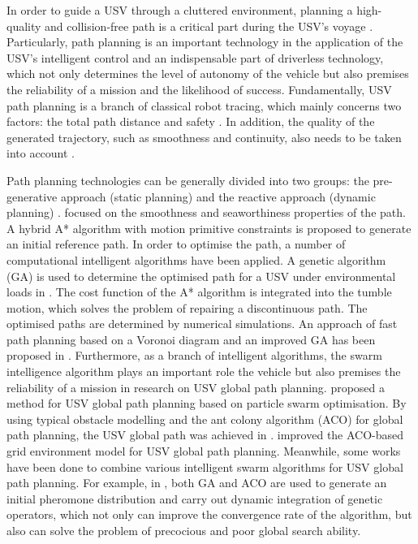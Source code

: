 \documentclass{PDS}%
\theoremstyle{definition}
\begin{document}
In order to guide a USV through a cluttered environment, planning a high-quality and
collision-free path is a critical part during the USV's voyage \citep{r7}. Particularly,
path planning is an important technology in the application of the USV's intelligent
control and an indispensable part of driverless technology, which not only determines the
level of autonomy of the vehicle but also premises the reliability of a mission and the
likelihood of success. Fundamentally, USV path planning is a branch of classical robot
tracing, which mainly concerns two factors: the total path distance and safety
\citep{r8}. In addition, the quality of the generated trajectory, such as smoothness and
continuity, also needs to be taken into account \citep{Smierzchalski1999}.


Path planning
technologies can be generally divided into two groups: the pre-generative approach
(static planning) and the reactive approach (dynamic planning) \citep{r11}.
\citet{ShiBinghua} focused on the smoothness and seaworthiness properties of the path. A
hybrid A* algorithm with motion primitive constraints is proposed to generate an initial
reference path. In order to optimise the path, a number of computational intelligent
algorithms have been applied. A genetic algorithm (GA) is used to determine the optimised
path for a USV under environmental loads in \citet{r15}. The cost function of the A* algorithm is integrated into the tumble motion, which
solves the problem of repairing a discontinuous path. The optimised paths are determined
by numerical simulations. An approach of fast path planning based on a Voronoi diagram
and an improved GA has been proposed in \citet{r16}. Furthermore, as a branch of intelligent
algorithms, the swarm intelligence algorithm plays an important role the vehicle but also premises the reliability of a mission in research on USV
global path planning. \citet{r17} proposed a method for USV global path planning based on
particle swarm optimisation. By using typical obstacle modelling and the ant colony
algorithm (ACO) for global path planning, the USV global path was achieved in \citet{r18}.
\citet{r19} improved the ACO-based grid environment model for USV global path
planning. Meanwhile, some works have been done to combine various intelligent swarm
algorithms for USV global path planning. For example, in \citet{r20}, both GA and ACO
are used to generate an initial pheromone distribution and carry out dynamic integration of
genetic operators, which not only can improve the convergence rate of the algorithm, but also can
solve the problem of precocious and poor global search ability.
\end{document}

